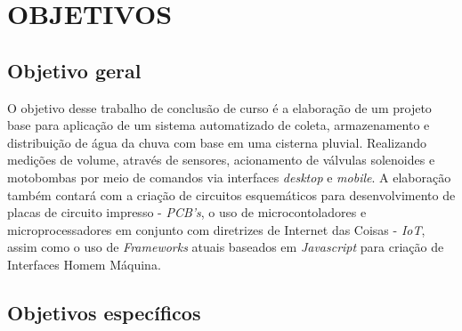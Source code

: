 
\chapter{OBJETIVOS}
\label{chap:objetivos}

\section{Objetivo geral}
\label{sec:objetivogeral}
O objetivo desse trabalho de conclusão de curso é a elaboração de um projeto base para aplicação de um sistema automatizado de coleta, armazenamento e distribuição de água da chuva com base em uma cisterna pluvial. Realizando medições de volume, através de sensores, acionamento de válvulas solenoides e motobombas por meio de comandos via interfaces \textit{desktop} e \textit{mobile}. A elaboração também contará com a criação de circuitos esquemáticos para desenvolvimento de placas de circuito impresso - \textit{PCB's}, o uso de microcontoladores e microprocessadores em conjunto com  diretrizes de Internet das Coisas - \textit{IoT},  assim como o uso de \textit{Frameworks} atuais baseados em \textit{Javascript} para criação de Interfaces Homem Máquina.

\section{Objetivos específicos}

